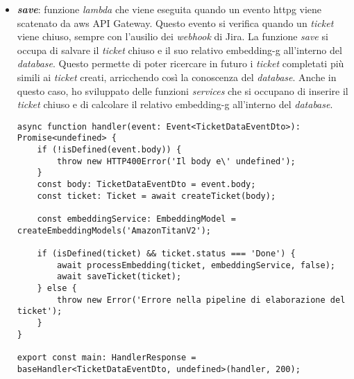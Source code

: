 \begin{itemize}
    \item \textbf{\textit{save}}: funzione \textit{lambda} che viene eseguita quando un evento \gls{httpg} viene scatenato da \gls{aws} API Gateway. Questo evento si verifica quando un \textit{ticket} viene chiuso, sempre con l'ausilio dei \textit{webhook} di Jira. La funzione \textit{save} si occupa di salvare il \textit{ticket} chiuso e il suo relativo \gls{embedding-g} all'interno del \textit{database}. Questo permette di poter ricercare in futuro i \textit{ticket} completati più simili ai \textit{ticket} creati, arricchendo così la conoscenza del \textit{database}.
    Anche in questo caso, ho sviluppato delle funzioni \textit{services} che si occupano di inserire il \textit{ticket} chiuso e di calcolare il relativo \gls{embedding-g} all'interno del \textit{database}.
    \begin{verbatim}
async function handler(event: Event<TicketDataEventDto>): Promise<undefined> {
    if (!isDefined(event.body)) {
        throw new HTTP400Error('Il body e\' undefined');
    }
    const body: TicketDataEventDto = event.body;
    const ticket: Ticket = await createTicket(body);
    
    const embeddingService: EmbeddingModel = createEmbeddingModels('AmazonTitanV2');
    
    if (isDefined(ticket) && ticket.status === 'Done') {
        await processEmbedding(ticket, embeddingService, false);
        await saveTicket(ticket);
    } else {
        throw new Error('Errore nella pipeline di elaborazione del ticket');
    }
}

export const main: HandlerResponse = baseHandler<TicketDataEventDto, undefined>(handler, 200);
    \end{verbatim}
\end{itemize}


